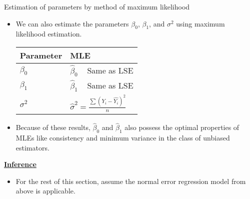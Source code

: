 \documentclass{article}
\newcommand{\bu}[1]{\textbf{\ul{#1}}}				%
\begin{document}
Estimation of parameters by method of maximum likelihood\bigskip
\begin{itemize}
    \item We can also estimate the parameters $\beta_0$, $\beta_1$, and $\sigma^2$ using maximum likelihood estimation.\bigskip\\
    \begin{tabular}{l l}
        Parameter  & MLE\\
        \hline
        $\beta_0$ & $\hat{\beta}_0 \hspace{10pt}$ Same as LSE\\
        $\beta_1$  & $\hat{\beta}_1 \hspace{10pt}$ Same as LSE\\
        $\sigma^2$ & $\displaystyle \hat{\sigma}^2 = \frac{\sum (Y_i - \hat{Y_i})^2}{n}$\\
    \end{tabular}\bigskip
    \item Because of these results, $\hat{\beta}_0$ and $\hat{\beta}_1$ also possess the optimal properties of MLEs like consistency and minimum variance in the class of unbiased estimators.
\end{itemize}\bigskip

\bu{Inference}\bigskip

\begin{itemize}
    \item For the rest of this section, assume the normal error regression model from above is applicable.
\end{itemize}\bigskip
\end{document}
